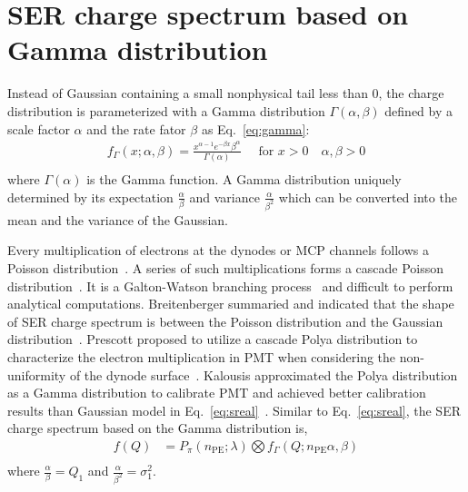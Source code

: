 \section{SER charge spectrum based on Gamma distribution}\label{gammapossion}
Instead of Gaussian containing a small nonphysical tail less than 0,
the charge distribution is parameterized with a Gamma distribution $\varGamma(\alpha, \beta)$ defined by a scale factor $\alpha$ and the rate fator $\beta$ as Eq.~\eqref{eq:gamma}:
\begin{equation}
    \label{eq:gamma}
    \begin{aligned}
        f_\Gamma(x ; \alpha, \beta) = \frac{x^{\alpha-1} e^{-\beta x} \beta^\alpha}{\Gamma(\alpha)} \quad \text { for } x>0 \quad \alpha, \beta>0 \\
    \end{aligned}
\end{equation}
where $\Gamma(\alpha)$ is the Gamma function.
A Gamma distribution uniquely determined by its expectation \(\frac{\alpha}{\beta}\) and variance \(\frac{\alpha}{\beta^2}\)
which can be converted into the mean and the variance of the Gaussian.

Every multiplication of electrons at the dynodes or MCP channels follows a Poisson distribution~\cite{branchandPoisson}.
A series of such multiplications forms a cascade Poisson distribution~\cite{1955Scintillation}.
It is a Galton-Watson branching process~\cite{Bartlett1963TheTO}
and difficult to perform analytical computations.
Breitenberger summaried and indicated that the shape of SER charge spectrum is between the Poisson distribution
and the Gaussian distribution~\cite{1955Scintillation}.
Prescott proposed to utilize a cascade Polya distribution to
characterize the electron multiplication in PMT
when considering the non-uniformity of the dynode surface~\cite{polya}.
Kalousis approximated the Polya distribution as a Gamma distribution to calibrate PMT
and achieved better calibration results than Gaussian model in Eq.~\eqref{eq:sreal}~\cite{2012Calibration,2020A}.
Similar to Eq.~\eqref{eq:sreal}, the SER charge spectrum based on the Gamma distribution is,
\begin{equation}
    \begin{aligned}
        f(Q) & = P_\pi(n_{\mathrm{PE}};\lambda)\bigotimes f_\Gamma(Q;n_{\mathrm{PE}}\alpha, \beta) \\
    \end{aligned}
    \label{eq:Gamma}
\end{equation}
where \(\frac{\alpha}{\beta}=Q_1\) and \(\frac{\alpha}{\beta^2}=\sigma_1^2\).